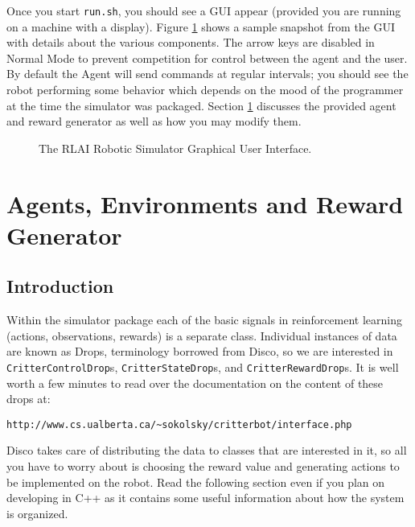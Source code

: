 \documentclass[12pt]{article}
\begin{document}
Once you start \verb+run.sh+, you should see a GUI appear (provided you are
running on a machine with a display). Figure \ref{fig:gui} shows a sample
snapshot from the GUI with details about the various components.
The arrow keys are disabled in Normal Mode to prevent competition for control 
between the agent and the user. 
By default the Agent will send commands at regular intervals;
you should see the robot performing some behavior which depends on the mood
of the programmer at the time the simulator was packaged. Section 
\ref{sec:writingAgentAndRewardGenerator} discusses the provided agent and
reward generator as well as how you may modify them. 

\begin{figure}\label{fig:gui}
\centerline{
}
\caption{The RLAI Robotic Simulator Graphical User Interface.}
\end{figure}

\section{Agents, Environments and Reward Generator}\label{sec:writingAgentAndRewardGenerator}

\subsection{Introduction}\label{subsec:programming_introduction}

Within the simulator package each of the basic signals in reinforcement learning (actions, observations, rewards) is a separate class.  Individual instances of data are known as Drops, terminology borrowed from Disco, so we are interested in \verb+CritterControlDrop+s, \verb+CritterStateDrop+s, and \verb+CritterRewardDrop+s.  It is well worth a few minutes to read over the documentation on the content of these drops at:

\begin{verbatim}
http://www.cs.ualberta.ca/~sokolsky/critterbot/interface.php
\end{verbatim}

Disco takes care of distributing the data to classes that are interested in it, so all you have to worry about is choosing the reward value and generating actions to be implemented on the robot.  Read the following section even if you plan on developing in C++ as it contains some useful information about how the system is organized.
\end{document}
